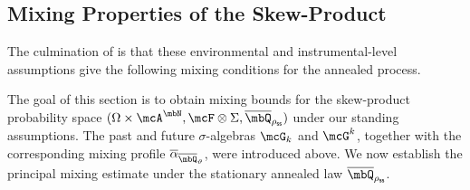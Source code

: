 \documentclass[a4paper]{article}
\numberwithin{equation}{section}   %
\theoremstyle{plain}   %
\theoremstyle{plain}   %
\theoremstyle{examplestyle}
\newcommand{\s}{\rho_{\mathsf{ss}}}     %
\begin{document}

\subsection{Mixing Properties of the Skew-Product}
\label{section:mixing_of_skew}


    The culmination of  is that these environmental and instrumental-level assumptions give the following mixing conditions for the annealed process. 

    The goal of this section is to obtain mixing bounds for the skew-product probability space $(\Omega\times\mcA^{\mbN},\mcF\otimes\Sigma, \overline{\mbQ}_{\s})$ under our standing assumptions. 
    The past and future \(\sigma\)-algebras \(\mcG_k\) and \(\mcG^k\), together with the corresponding
    mixing profile \(\overline{\alpha}_{\overline{\mbQ}_{\vartheta}}\),   were introduced above.
    We now establish the principal mixing estimate under the stationary annealed law \(\overline{\mbQ}_{\s}\).
\end{document}
